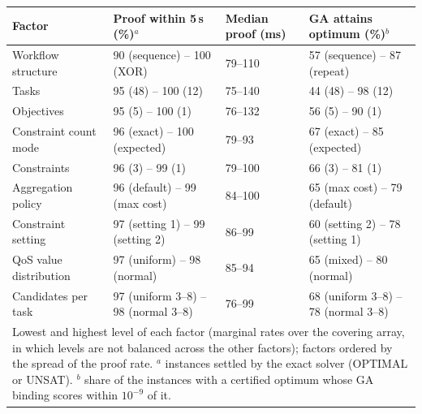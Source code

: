 \begin{tabular}{@{}llll@{}}
\toprule
Factor & Proof within 5\,s (\%)$^{a}$ & Median proof (ms) & GA attains optimum (\%)$^{b}$ \\
\midrule
Workflow structure & 90 (sequence) -- 100 (XOR) & 79--110 & 57 (sequence) -- 87 (repeat) \\
Tasks & 95 (48) -- 100 (12) & 75--140 & 44 (48) -- 98 (12) \\
Objectives & 95 (5) -- 100 (1) & 76--132 & 56 (5) -- 90 (1) \\
Constraint count mode & 96 (exact) -- 100 (expected) & 79--93 & 67 (exact) -- 85 (expected) \\
Constraints & 96 (3) -- 99 (1) & 79--100 & 66 (3) -- 81 (1) \\
Aggregation policy & 96 (default) -- 99 (max cost) & 84--100 & 65 (max cost) -- 79 (default) \\
Constraint setting & 97 (setting 1) -- 99 (setting 2) & 86--99 & 60 (setting 2) -- 78 (setting 1) \\
QoS value distribution & 97 (uniform) -- 98 (normal) & 85--94 & 65 (mixed) -- 80 (normal) \\
Candidates per task & 97 (uniform 3--8) -- 98 (normal 3--8) & 76--99 & 68 (uniform 3--8) -- 78 (normal 3--8) \\
\bottomrule
\multicolumn{4}{p{0.97\linewidth}}{\footnotesize Lowest and highest level of each factor (marginal rates over the covering array, in which levels are not balanced across the other factors); factors ordered by the spread of the proof rate. $^{a}$ instances settled by the exact solver (OPTIMAL or UNSAT). $^{b}$ share of the instances with a certified optimum whose GA binding scores within $10^{-9}$ of it.}
\end{tabular}
